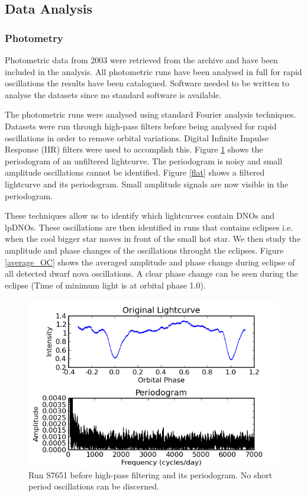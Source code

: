 \documentclass[a4paper,10pt]{article}
\begin{document}
\subsection{Data Analysis}
\subsubsection{Photometry}

Photometric data from 2003 were retrieved from the archive and have been included in the analysis. All photometric runs have been analysed in full for rapid oscillations the results have been catalogued. Software needed to be written to analyse the datasets since no standard software is available. 

The photometric runs were analysed using standard Fourier analysis techniques. Datasets were run through high-pass filters before being analysed for rapid oscillations in order to remove orbital variations. Digital Infinite Impulse Response (IIR) filters were used to accomplish this. Figure \ref{unflat} shows the periodogram of an unfiltered lightcurve. The periodogram is noisy and small amplitude oscillations cannot be identified. Figure \ref{flat} shows a filtered lightcurve and its periodogram. Small amplitude signals are now visible in the periodogram.

These techniques allow us to identify which lightcurves contain DNOs and lpDNOs. These oscillations are then identified in runs that contains eclipses i.e. when the cool bigger star moves in front of the small hot star. We then study the amplitude and phase changes of the oscillations throught the eclipses. Figure \ref{average_OC} shows the averaged amplitude and phase change during eclipse of all detected dwarf nova oscillations. A clear phase change can be seen during the eclipse (Time of minimum light is at orbital phase 1.0).


\begin{figure}
 \centering
 \includegraphics[bb=0 0 600 400,width=0.8\columnwidth]{../images/unflattened.png}
 \caption{Run S7651 before high-pass filtering and its periodogram. No short period oscillations can be discerned.}
 \label{unflat}
\end{figure}
\end{document}
